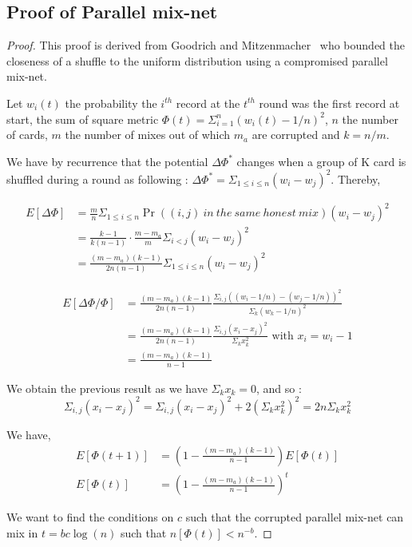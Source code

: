 \documentclass[USenglish,oneside,twocolumn]{article}
\begin{document}
\subsection{Proof of Parallel mix-net}\label{proof:pmn}
\begin{proof}
This proof is derived from Goodrich and Mitzenmacher~\cite{goodrich2012privacy} who bounded the closeness of a shuffle to the uniform distribution using a compromised parallel mix-net. 

Let $w_i(t)$ the probability the $i^{th}$ record at the $t^{th}$ round was the first record at start, the sum of square metric $\Phi(t)=\Sigma_{i=1}^n (w_i(t)-1/n)^2$, $n$ the number of cards, $m$ the number of mixes out of which $m_a$ are corrupted and $k=n/m$.

We have by recurrence that the potential $\Delta\Phi^*$ changes when a group of K card is shuffled during a round as following : $\Delta\Phi^*=\Sigma_{1\leq i\leq n}(w_i-w_j)^2$.
Thereby,

\begin{align*}
E[\Delta\Phi] & = \frac{m}{n} \Sigma_{1\leq i\leq n} \Pr((i,j)\ in\ the\ same\ honest\ mix) (w_i-w_j)^2\\
&=\frac{k-1}{k(n-1)}\cdot \frac{m-m_a}{m} \Sigma_{i<j}(w_i-w_j)^2\\
&=\frac{(m-m_a)(k-1)}{2n(n-1)}\Sigma_{1\leq i\leq n}(w_i-w_j)^2
\end{align*}

\begin{align*}
E[\Delta\Phi/\Phi]&=\frac{(m-m_a)(k-1)}{2n(n-1)}\frac{\Sigma_{i,j}((w_i-1/n)-(w_j-1/n))^2}{\Sigma_k (w_k-1/n)^2}\\
&=\frac{(m-m_a)(k-1)}{2n(n-1)}\frac{\Sigma_{i,j}(x_i-x_j)^2}{\Sigma_k x_k^2} \text{ with $x_i=w_i-1$}\\
&=\frac{(m-m_a)(k-1)}{n-1} 
\end{align*}

We obtain the previous result as we have $\Sigma_k x_k=0$, and so :$$\Sigma_{i,j}(x_i-x_j)^2 = \Sigma_{i,j}(x_i-x_j)^2 + 2\left(\Sigma_k x_k^2 \right)^2  = 2n\Sigma_k x_k^2$$

We have,
\begin{align*}
E[\Phi(t+1)] &= (1-\frac{(m-m_a)(k-1)}{n-1}) E[\Phi(t)]\\
E[\Phi(t)]&= (1-\frac{(m-m_a)(k-1)}{n-1})^t
\end{align*} 

We want to find the conditions on $c$ such that the corrupted parallel mix-net can mix in $t=bc\log(n)$  such that $n[\Phi(t)]< n^{-b}$.


\end{proof}
\end{document}
